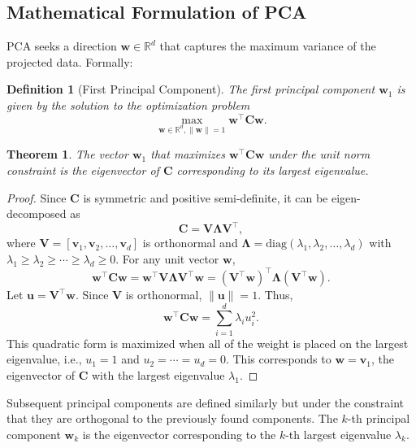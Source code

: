 \documentclass[12pt,a4paper]{article}
\newtheorem{definition}{Definition}
\newtheorem{theorem}{Theorem}
\begin{document}
\subsection{Mathematical Formulation of PCA}
PCA seeks a direction $\mathbf{w} \in \mathbb{R}^d$ that captures the maximum variance of the projected data. Formally:

\begin{definition}[First Principal Component]
The first principal component $\mathbf{w}_1$ is given by the solution to the optimization problem
\[
\max_{\mathbf{w} \in \mathbb{R}^d, \|\mathbf{w}\|=1} \mathbf{w}^\top \mathbf{C} \mathbf{w}.
\]
\end{definition}

\begin{theorem}
\label{thm:largest_eigenvector}
The vector $\mathbf{w}_1$ that maximizes $\mathbf{w}^\top \mathbf{C} \mathbf{w}$ under the unit norm constraint is the eigenvector of $\mathbf{C}$ corresponding to its largest eigenvalue.
\end{theorem}

\begin{proof}
Since $\mathbf{C}$ is symmetric and positive semi-definite, it can be eigen-decomposed as
\[
\mathbf{C} = \mathbf{V}\bm{\Lambda}\mathbf{V}^\top,
\]
where $\mathbf{V} = [\mathbf{v}_1, \mathbf{v}_2, \ldots, \mathbf{v}_d]$ is orthonormal and $\bm{\Lambda} = \mathrm{diag}(\lambda_1,\lambda_2,\ldots,\lambda_d)$ with $\lambda_1 \geq \lambda_2 \geq \cdots \geq \lambda_d \geq 0$. For any unit vector $\mathbf{w}$,
\[
\mathbf{w}^\top \mathbf{C}\mathbf{w} = \mathbf{w}^\top \mathbf{V}\bm{\Lambda}\mathbf{V}^\top \mathbf{w} = (\mathbf{V}^\top \mathbf{w})^\top \bm{\Lambda} (\mathbf{V}^\top \mathbf{w}).
\]
Let $\mathbf{u} = \mathbf{V}^\top \mathbf{w}$. Since $\mathbf{V}$ is orthonormal, $\|\mathbf{u}\|=1$. Thus,
\[
\mathbf{w}^\top \mathbf{C}\mathbf{w} = \sum_{i=1}^d \lambda_i u_i^2.
\]
This quadratic form is maximized when all of the weight is placed on the largest eigenvalue, i.e., $u_1 = 1$ and $u_2 = \cdots = u_d = 0$. This corresponds to $\mathbf{w} = \mathbf{v}_1$, the eigenvector of $\mathbf{C}$ with the largest eigenvalue $\lambda_1$.
\end{proof}

Subsequent principal components are defined similarly but under the constraint that they are orthogonal to the previously found components. The $k$-th principal component $\mathbf{w}_k$ is the eigenvector corresponding to the $k$-th largest eigenvalue $\lambda_k$.
\end{document}
